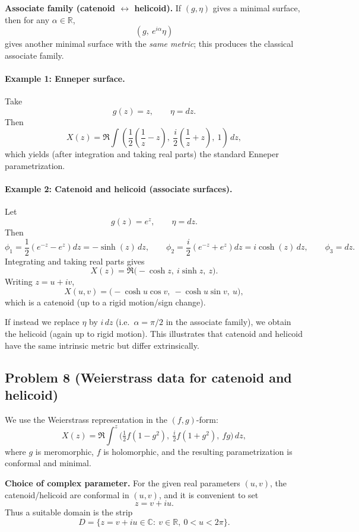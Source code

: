 \documentclass[12pt,a4paper]{article}
\theoremstyle{plain}
\theoremstyle{definition}      %
\begin{document}
	\medskip
	\textbf{Associate family (catenoid $\leftrightarrow$ helicoid).}
	If $(g,\eta)$ gives a minimal surface, then for any $\alpha\in\mathbb{R}$,
	\[
	(g,\ e^{i\alpha}\eta)
	\]
	gives another minimal surface with the \emph{same metric}; this produces the classical associate family.
	
	\bigskip
	\paragraph{Example 1: Enneper surface.}
	Take
	\[
	g(z)=z,\qquad \eta = dz.
	\]
	Then
	\[
	X(z)=\Re\int \left(\frac12\left(\frac{1}{z}-z\right),\ \frac{i}{2}\left(\frac{1}{z}+z\right),\ 1\right)\,dz,
	\]
	which yields (after integration and taking real parts) the standard Enneper parametrization.
	
	\bigskip
	\paragraph{Example 2: Catenoid and helicoid (associate surfaces).}
	Let
	\[
	g(z)=e^{z},\qquad \eta=dz.
	\]
	Then
	\[
	\phi_1=\frac12(e^{-z}-e^{z})dz=-\sinh(z)\,dz,\qquad
	\phi_2=\frac{i}{2}(e^{-z}+e^{z})dz=i\cosh(z)\,dz,\qquad
	\phi_3=dz.
	\]
	Integrating and taking real parts gives
	\[
	X(z)=\Re\bigl(-\cosh z,\ i\sinh z,\ z\bigr).
	\]
	Writing $z=u+iv$,
	\[
	X(u,v)=\bigl(-\cosh u\cos v,\ -\cosh u\sin v,\ u\bigr),
	\]
	which is a catenoid (up to a rigid motion/sign change).
	
	If instead we replace $\eta$ by $i\,dz$ (i.e.\ $\alpha=\pi/2$ in the associate family),
	we obtain the helicoid (again up to rigid motion). This illustrates that catenoid and helicoid have the same
	intrinsic metric but differ extrinsically.
	
	
	\subsection*{Problem 8 (Weierstrass data for catenoid and helicoid)}
	We use the Weierstrass representation in the $(f,g)$-form:
	\[
	X(z)=\Re\int^z \Big(\tfrac12 f(1-g^2),\ \tfrac{i}{2}f(1+g^2),\ fg\Big)\,dz,
	\]
	where $g$ is meromorphic, $f$ is holomorphic, and the resulting parametrization is conformal and minimal.
	
	\medskip
	\textbf{Choice of complex parameter.}
	For the given real parameters $(u,v)$, the catenoid/helicoid are conformal in $(u,v)$, and it is convenient to set
	\[
	z=v+iu.
	\]
	Thus a suitable domain is the strip
	\[
	D=\{z=v+iu\in\mathbb{C}:\ v\in\mathbb{R},\ 0<u<2\pi\}.
	\]
	
\end{document}
